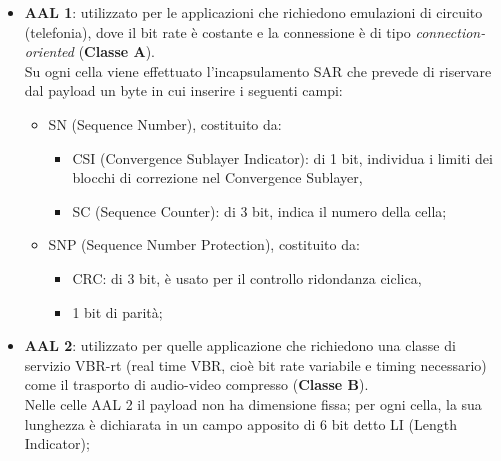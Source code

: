 \documentclass[a4paper, twoside]{article}
\begin{document}
\begin{itemize}
	\item \textbf{AAL 1}: utilizzato per le applicazioni che richiedono emulazioni di circuito (telefonia), dove il bit rate è costante e la connessione è di tipo \textit{connection-oriented} (\textbf{Classe A}).
	\\Su ogni cella viene effettuato l'incapsulamento SAR che prevede di riservare dal payload un byte in cui inserire i seguenti campi:
	\begin{itemize}
		\item SN (Sequence Number), costituito da:
		\begin{itemize}
			\item CSI (Convergence Sublayer Indicator): di 1 bit, individua i limiti dei blocchi di correzione nel Convergence Sublayer,
			\item SC (Sequence Counter): di 3 bit, indica il numero della 	cella;
		\end{itemize}
		\item SNP (Sequence Number Protection), costituito da:
		\begin{itemize}
			\item CRC: di 3 bit, è usato per il controllo ridondanza ciclica,
			\item 1 bit di parità;
		\end{itemize}
	\end{itemize}
	
	\item \textbf{AAL 2}: utilizzato per quelle applicazione che richiedono una classe di servizio VBR-rt (real time VBR, cioè bit rate variabile e timing necessario) come il trasporto di audio-video compresso (\textbf{Classe B}).
	\\Nelle celle AAL 2 il payload non ha dimensione fissa; per ogni cella, la sua lunghezza è dichiarata in un campo apposito di 6 bit detto LI (Length Indicator);
	

\end{itemize}
\end{document}
